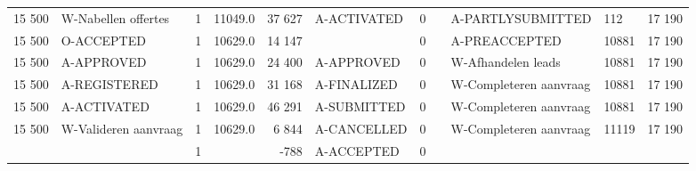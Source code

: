 \begin{tabular}{rlrlrlrllll}
15 500 & W-Nabellen offertes & 1 & 11049.0 & 37 627 & A-ACTIVATED & 0 &  & A-PARTLYSUBMITTED & 112 & 17 190 \\
15 500 & O-ACCEPTED & 1 & 10629.0 & 14 147 &  & 0 &  & A-PREACCEPTED & 10881 & 17 190 \\
15 500 & A-APPROVED & 1 & 10629.0 & 24 400 & A-APPROVED & 0 &  & W-Afhandelen leads & 10881 & 17 190 \\
15 500 & A-REGISTERED & 1 & 10629.0 & 31 168 & A-FINALIZED & 0 &  & W-Completeren aanvraag & 10881 & 17 190 \\
15 500 & A-ACTIVATED & 1 & 10629.0 & 46 291 & A-SUBMITTED & 0 &  & W-Completeren aanvraag & 10881 & 17 190 \\
15 500 & W-Valideren aanvraag & 1 & 10629.0 & 6 844 & A-CANCELLED & 0 &  & W-Completeren aanvraag & 11119 & 17 190 \\
 &  & 1 &  & -788 & A-ACCEPTED & 0 &  &  &  &  \\
\bottomrule
\end{tabular}
